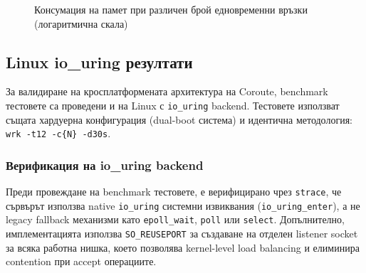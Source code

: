 \begin{figure}[H]
\caption{Консумация на памет при различен брой едновременни връзки (логаритмична скала)}
\label{fig:memory-chart}
\end{figure}

\subsection{Linux io\_uring резултати}

За валидиране на кросплатформената архитектура на Coroute, benchmark тестовете са проведени и на Linux с \texttt{io\_uring} backend. Тестовете използват същата хардуерна конфигурация (dual-boot система) и идентична методология: \texttt{wrk -t12 -c\{N\} -d30s}.

\subsubsection{Верификация на io\_uring backend}

Преди провеждане на benchmark тестовете, е верифицирано чрез \texttt{strace}, че сървърът използва native \texttt{io\_uring} системни извиквания (\texttt{io\_uring\_enter}), а не legacy fallback механизми като \texttt{epoll\_wait}, \texttt{poll} или \texttt{select}. Допълнително, имплементацията използва \texttt{SO\_REUSEPORT} за създаване на отделен listener socket за всяка работна нишка, което позволява kernel-level load balancing и елиминира contention при accept операциите.

